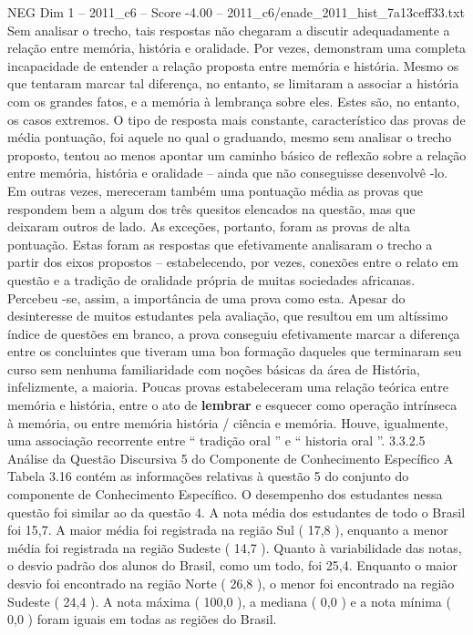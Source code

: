 \begin{textsample}{NEG Dim 1 – 2011\_c6 – Score -4.00 – 2011\_c6/enade\_2011\_hist\_7a13ceff33.txt}
Sem analisar o trecho, tais respostas não chegaram a discutir adequadamente a relação entre memória, história e oralidade.
Por vezes, demonstram uma completa incapacidade de entender a relação proposta entre memória e história.
Mesmo os que tentaram marcar tal diferença, no entanto, se limitaram a associar a história com os grandes fatos, e a memória à lembrança sobre eles.
Estes são, no entanto, os casos extremos.
O tipo de resposta mais constante, característico das provas de média pontuação, foi aquele no qual o graduando, mesmo sem analisar o trecho proposto, tentou ao menos apontar um caminho básico de reflexão sobre a relação entre memória, história e oralidade – ainda que não conseguisse desenvolvê -lo.
Em outras vezes, mereceram também uma pontuação média as provas que respondem bem a algum dos três quesitos elencados na questão, mas que deixaram outros de lado.
As exceções, portanto, foram as provas de alta pontuação.
Estas foram as respostas que efetivamente analisaram o trecho a partir dos eixos propostos – estabelecendo, por vezes, conexões entre o relato em questão e a tradição de oralidade própria de muitas sociedades africanas.
Percebeu -se, assim, a importância de uma prova como esta.
Apesar do desinteresse de muitos estudantes pela avaliação, que resultou em um altíssimo índice de questões em branco, a prova conseguiu efetivamente marcar a diferença entre os concluintes que tiveram uma boa formação daqueles que terminaram seu curso sem nenhuma familiaridade com noções básicas da área de História, infelizmente, a maioria.
Poucas provas estabeleceram uma relação teórica entre memória e história, entre o ato de \textbf{lembrar} e esquecer como operação intrínseca à memória, ou entre memória história / ciência e memória.
Houve, igualmente, uma associação recorrente entre “ tradição oral ” e “ historia oral ”. 3.3.2.5 Análise da Questão Discursiva 5 do Componente de Conhecimento Específico A Tabela 3.16 contém as informações relativas à questão 5 do conjunto do componente de Conhecimento Específico.
O desempenho dos estudantes nessa questão foi similar ao da questão 4.
A nota média dos estudantes de todo o Brasil foi 15,7.
A maior média foi registrada na região Sul ( 17,8 ), enquanto a menor média foi registrada na região Sudeste ( 14,7 ).
Quanto à variabilidade das notas, o desvio padrão dos alunos do Brasil, como um todo, foi 25,4.
Enquanto o maior desvio foi encontrado na região Norte ( 26,8 ), o menor foi encontrado na região Sudeste ( 24,4 ).
A nota máxima ( 100,0 ), a mediana ( 0,0 ) e a nota mínima ( 0,0 ) foram iguais em todas as regiões do Brasil.

\end{textsample}
